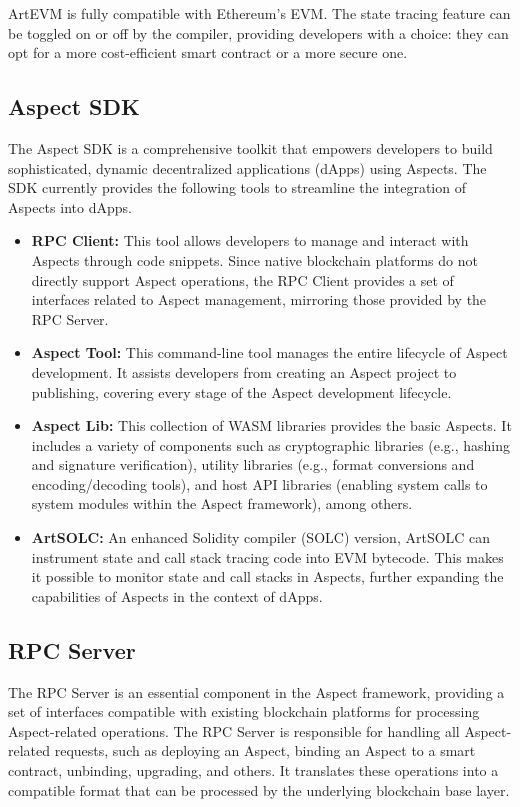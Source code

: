 ArtEVM is fully compatible with Ethereum's EVM. The state tracing feature can be toggled on or off by the compiler, providing developers with a choice: they can opt for a more cost-efficient smart contract or a more secure one.

\subsection{Aspect SDK}

The Aspect SDK is a comprehensive toolkit that empowers developers to build sophisticated, dynamic decentralized applications (dApps) using Aspects. The SDK currently provides the following tools to streamline the integration of Aspects into dApps.

\begin{itemize}
  \item \textbf{RPC Client:} This tool allows developers to manage and interact with Aspects through code snippets. Since native blockchain platforms do not directly support Aspect operations, the RPC Client provides a set of interfaces related to Aspect management, mirroring those provided by the RPC Server.
  
  \item \textbf{Aspect Tool:} This command-line tool manages the entire lifecycle of Aspect development. It assists developers from creating an Aspect project to publishing, covering every stage of the Aspect development lifecycle.
  
  \item \textbf{Aspect Lib:} This collection of WASM libraries provides the basic Aspects. It includes a variety of components such as cryptographic libraries (e.g., hashing and signature verification), utility libraries (e.g., format conversions and encoding/decoding tools), and host API libraries (enabling system calls to system modules within the Aspect framework), among others.
  
  \item \textbf{ArtSOLC:} An enhanced Solidity compiler (SOLC) version, ArtSOLC can instrument state and call stack tracing code into EVM bytecode. This makes it possible to monitor state and call stacks in Aspects, further expanding the capabilities of Aspects in the context of dApps.
\end{itemize}

\subsection{RPC Server}

The RPC Server is an essential component in the Aspect framework, providing a set of interfaces compatible with existing blockchain platforms for processing Aspect-related operations. The RPC Server is responsible for handling all Aspect-related requests, such as deploying an Aspect, binding an Aspect to a smart contract, unbinding, upgrading, and others. It translates these operations into a compatible format that can be processed by the underlying blockchain base layer.
